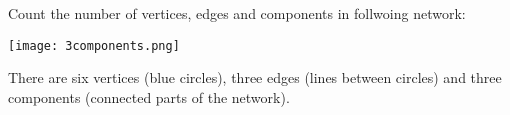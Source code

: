 Count the number of vertices, edges and components in follwoing network:
\begin{center}
\texttt{[image: 3components.png]}
\end{center}

\solution
There are six vertices (blue circles), three edges (lines between circles) and three components (connected parts of the network). 


